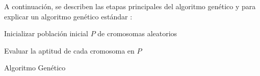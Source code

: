 A continuación, se describen las etapas principales del algoritmo genético y para explicar un algoritmo genético estándar :

\begin{algorithm}[H]

\SetAlgoLined
{}
Inicializar población inicial $P$ de cromosomas aleatorios\;

Evaluar la aptitud de cada cromosoma en $P$\;

\caption{Algoritmo Genético}
\end{algorithm}

